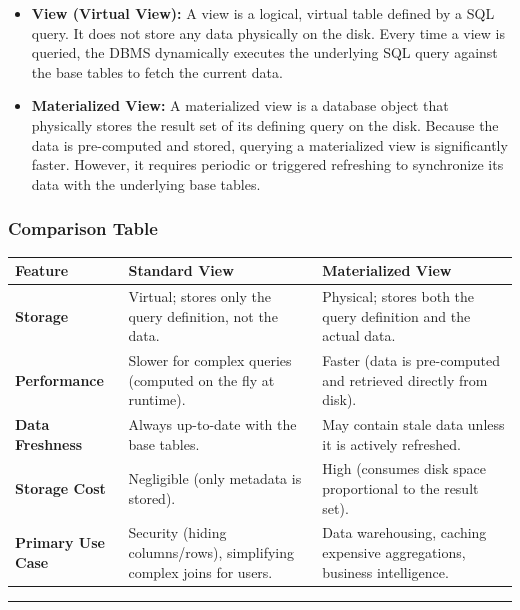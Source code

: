 \documentclass[12pt,a3paper]{article}
\begin{document}
\begin{enumerate}
\begin{tcolorbox}[enhanced,breakable,ansbox,colback=cA!4,colframe=cA,boxrule=0.8pt,arc=5pt,title={\textbf{Answer}},fonttitle=\bfseries\color{white},colbacktitle=cA]
\begin{itemize}
    \item \textbf{View (Virtual View):} A view is a logical, virtual table defined by a SQL query. It does not store any data physically on the disk. Every time a view is queried, the DBMS dynamically executes the underlying SQL query against the base tables to fetch the current data.
    \item \textbf{Materialized View:} A materialized view is a database object that physically stores the result set of its defining query on the disk. Because the data is pre-computed and stored, querying a materialized view is significantly faster. However, it requires periodic or triggered refreshing to synchronize its data with the underlying base tables.
\end{itemize}

\vspace{0.5em}
\subsubsection*{Comparison Table}

\begin{center}
\renewcommand{\arraystretch}{1.4}
\begin{tabular}{@{} p{3.5cm} p{5.5cm} p{5.5cm} @{}}
\toprule
\textbf{Feature} & \textbf{Standard View} & \textbf{Materialized View} \\
\midrule
\textbf{Storage} & Virtual; stores only the query definition, not the data. & Physical; stores both the query definition and the actual data. \\
\textbf{Performance} & Slower for complex queries (computed on the fly at runtime). & Faster (data is pre-computed and retrieved directly from disk). \\
\textbf{Data Freshness} & Always up-to-date with the base tables. & May contain stale data unless it is actively refreshed. \\
\textbf{Storage Cost} & Negligible (only metadata is stored). & High (consumes disk space proportional to the result set). \\
\textbf{Primary Use Case} & Security (hiding columns/rows), simplifying complex joins for users. & Data warehousing, caching expensive aggregations, business intelligence. \\
\bottomrule
\end{tabular}
\end{center}

\vspace{1em}
\hrule
\vspace{1em}


\end{tcolorbox}
\end{enumerate}
\end{document}
